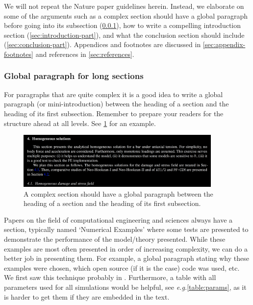 \documentclass[authoryear,3p,times,preprint,review,fleqn]{elsarticle}
\newcommand{\eg}{\textit{e.g.}\xspace}
\numberwithin{equation}{section}
\theoremstyle{remark}
\begin{document}
 We will not repeat the Nature paper guidelines herein. Instead, we elaborate on some of the arguments such as a complex section should have a global paragraph before going into its subsection (\cref{sec:global-para}), how to write a compelling introduction section (\cref{sec:introduction-part}), and 
what the conclusion section  should include (\cref{sec:conclusion-part}).  Appendices and footnotes are discussed in \cref{sec:appendix-footnotes} and references in \cref{sec:references}.

\subsubsection{Global paragraph for long sections}\label{sec:global-para}

For paragraphs that are quite complex it is a good idea to write a global paragraph (or mini-introduction) between the heading of a section and the heading of its first subsection. Remember to prepare your readers for the structure ahead at all levels. See \cref{fig:section} for an example. 


\begin{figure}[!h]
  \centering
  \includegraphics[width=0.9\textwidth]{section}
  \caption{A complex section should have a global paragraph between the heading of a section and the heading of its first subsection.}
  \label{fig:section}
\end{figure}


Papers on the field of computational engineering and sciences always have a section, typically named `Numerical Examples' where some tests are presented to demonstrate the performance of the model/theory presented. While these examples are most often presented in order of increasing complexity, we can do a better job in presenting them. For example, a global paragraph stating why these examples were chosen, which open source (if it is the case) code was used, etc. We first saw this technique probably in \cite{huang2003modeling}. Furthermore, a table with all parameters used for all simulations would be helpful, see \eg \cref{table:params}, as it is harder to get them if they are embedded in the text.
\end{document}
